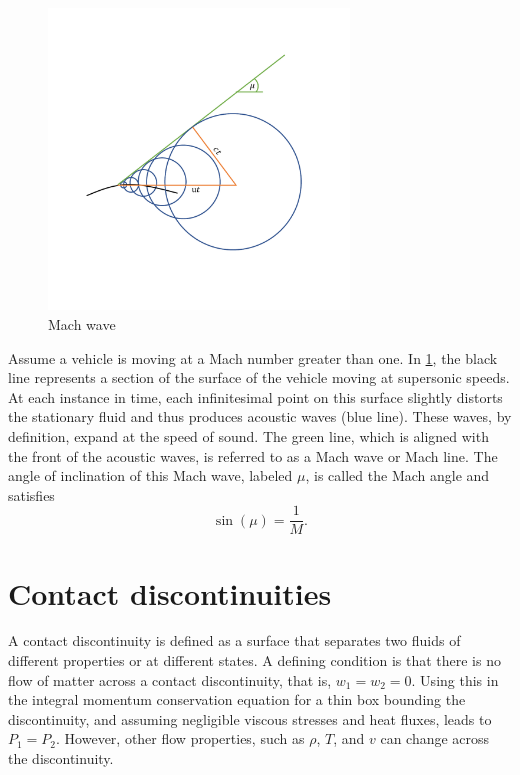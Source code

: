 \documentclass[oneside,a4paper,11pt]{report}
\begin{document}
\begin{figure}[ht]
\centering
\includegraphics[width=8cm]{../../../images/mach_wave.pdf}
\caption{Mach wave}
\label{fig:mach_wave}
\end{figure}
Assume a vehicle is moving at a Mach number greater than one. In \cref{fig:mach_wave}, the black line represents a section of the surface of the vehicle moving at supersonic speeds. At each instance in time, each infinitesimal point on this surface slightly distorts the stationary fluid and thus produces acoustic waves (blue line). These waves, by definition, expand at the speed of sound. The green line, which is aligned with the front of the acoustic waves, is referred to as a Mach wave or Mach line. The angle of inclination of this Mach wave, labeled $\mu$, is called the Mach angle and satisfies
\begin{equation}
    \sin (\mu) = \frac{1}{M}.
\end{equation}


\section{Contact discontinuities}
A contact discontinuity is defined as a surface that separates two fluids of different properties or at different states. A defining condition is that there is no flow of matter across a contact discontinuity, that is, $w_1 = w_2 = 0$. Using this in the integral momentum conservation equation for a thin box bounding the discontinuity, and assuming negligible viscous stresses and heat fluxes, leads to $P_1 = P_2$. However, other flow properties, such as $\rho$, $T$, and $v$ can change across the discontinuity.
\end{document}
